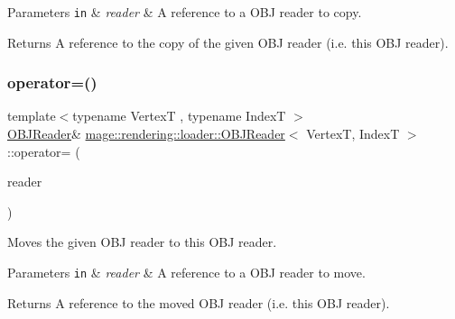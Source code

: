 \begin{DoxyParams}[1]{Parameters}
\mbox{\tt in}  & {\em reader} & A reference to a O\+BJ reader to copy. \\
\hline
\end{DoxyParams}
\begin{DoxyReturn}{Returns}
A reference to the copy of the given O\+BJ reader (i.\+e. this O\+BJ reader). 
\end{DoxyReturn}
\mbox{\label{classmage_1_1rendering_1_1loader_1_1_o_b_j_reader_ad35fe46e20179ce1cd79386501ee0959}} 
\subsubsection{\texorpdfstring{operator=()}{operator=()}\hspace{0.1cm}{\footnotesize\ttfamily [2/2]}}
{\footnotesize\ttfamily template$<$typename VertexT , typename IndexT $>$ \\
\mbox{\hyperlink{classmage_1_1rendering_1_1loader_1_1_o_b_j_reader}{O\+B\+J\+Reader}}\& \mbox{\hyperlink{classmage_1_1rendering_1_1loader_1_1_o_b_j_reader}{mage\+::rendering\+::loader\+::\+O\+B\+J\+Reader}}$<$ VertexT, IndexT $>$\+::operator= (\begin{DoxyParamCaption}\item[{\mbox{\hyperlink{classmage_1_1rendering_1_1loader_1_1_o_b_j_reader}{O\+B\+J\+Reader}}$<$ VertexT, IndexT $>$ \&\&}]{reader }\end{DoxyParamCaption})\hspace{0.3cm}{\ttfamily [delete]}}

Moves the given O\+BJ reader to this O\+BJ reader.


\begin{DoxyParams}[1]{Parameters}
\mbox{\tt in}  & {\em reader} & A reference to a O\+BJ reader to move. \\
\hline
\end{DoxyParams}
\begin{DoxyReturn}{Returns}
A reference to the moved O\+BJ reader (i.\+e. this O\+BJ reader). 
\end{DoxyReturn}
\mbox{\label{classmage_1_1rendering_1_1loader_1_1_o_b_j_reader_a281c16ef7d20a7c1416923f3cadee33a}} 

